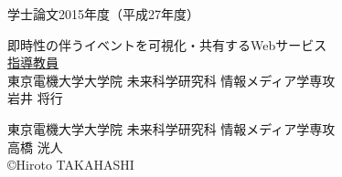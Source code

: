 \pagestyle{empty}
\begin{center}

\LARGE{学士論文\hspace{10mm}2015年度（平成27年度）}\\

\vspace{19mm}

\huge{即時性の伴うイベントを可視化・共有するWebサービス}\\
\vspace{60mm}
\large{\underline{指導教員}}\\
\large{東京電機大学大学院 未来科学研究科 情報メディア学専攻}\\
\Large{岩井 将行}\\

\vspace{40mm}

\large{東京電機大学大学院 未来科学研究科 情報メディア学専攻}\\
\LARGE{高橋 洸人}\\
\large{\copyright Hiroto TAKAHASHI}\\
\end{center}
